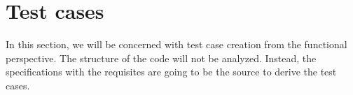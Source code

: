 \section{Test cases}
\label{sec-testcases}

In this section, we will be concerned with test case creation from the functional perspective. The structure of the code will not be analyzed. Instead, the specifications with the requisites are going to be the source to derive the test cases.




%
